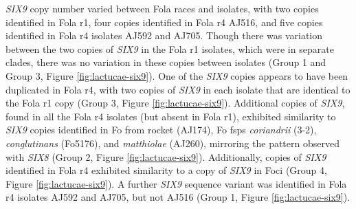 \textit{SIX9} copy number varied between \ac{Fola} races and isolates, with two copies identified in \ac{Fola} \ac{r1}, four copies identified in \ac{Fola} \ac{r4} AJ516, and five copies identified in \ac{Fola} \ac{r4} isolates AJ592 and AJ705. Though there was variation between the two copies of \textit{SIX9} in the \ac{Fola} \ac{r1} isolates, which were in separate clades, there was no variation in these copies between isolates (Group 1 and Group 3, Figure \ref{fig:lactucae-six9}). One of the \textit{SIX9} copies appears to have been duplicated in \ac{Fola} \ac{r4}, with two copies of \textit{SIX9} in each isolate that are identical to the \ac{Fola} \ac{r1} copy (Group 3, Figure \ref{fig:lactucae-six9}). Additional copies of \textit{SIX9}, found in all the \ac{Fola} \ac{r4} isolates (but absent in \ac{Fola} \ac{r1}), exhibited similarity to \textit{SIX9} copies identified in \ac{Fo} from rocket (AJ174), \ac{Fo} \acp{fsp} \textit{coriandrii} (3-2), \textit{conglutinans} (Fo5176), and \textit{matthiolae} (AJ260), mirroring the pattern observed with \textit{SIX8} (Group 2, Figure \ref{fig:lactucae-six9}). Additionally, copies of \textit{SIX9} identified in \ac{Fola} \ac{r4} exhibited similarity to a copy of \textit{SIX9} in \ac{Foci} (Group 4, Figure \ref{fig:lactucae-six9}). A further \textit{SIX9} sequence variant was identified in \ac{Fola} \ac{r4} isolates AJ592 and AJ705, but not AJ516 (Group 1, Figure \ref{fig:lactucae-six9}). 

